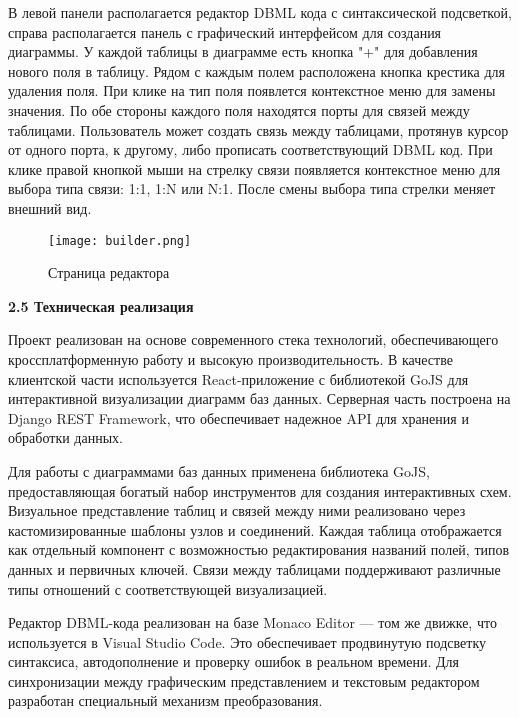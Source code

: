В левой панели располагается редактор DBML кода с синтаксической подсветкой, справа располагается панель с графический интерфейсом для создания диаграммы. У каждой таблицы в диаграмме есть кнопка "+" для добавления нового поля в таблицу. Рядом с каждым полем расположена кнопка крестика для удаления поля. При клике на тип поля появлется контекстное меню для замены значения. По обе стороны каждого поля находятся порты для связей между таблицами. Пользователь может создать связь между таблицами, протянув курсор от одного порта, к другому, либо прописать соответствующий DBML код. При клике правой кнопкой мыши на стрелку связи появляется контекстное меню для выбора типа связи: 1:1, 1:N или N:1. После смены выбора типа стрелки меняет внешний вид.
    
\renewcommand{\figurename}{Рисунок}
\begin{figure}[htbp]
    \centering %
    \texttt{[image: builder.png]}
    \caption{Страница редактора}
    \label{fig:analyze} %
\end{figure}

\textbf{2.5 Техническая реализация}

Проект реализован на основе современного стека технологий, обеспечивающего кроссплатформенную работу и высокую производительность. В качестве клиентской части используется React-приложение с библиотекой GoJS для интерактивной визуализации диаграмм баз данных. Серверная часть построена на Django REST Framework, что обеспечивает надежное API для хранения и обработки данных.

Для работы с диаграммами баз данных применена библиотека GoJS, предоставляющая богатый набор инструментов для создания интерактивных схем. Визуальное представление таблиц и связей между ними реализовано через кастомизированные шаблоны узлов и соединений. Каждая таблица отображается как отдельный компонент с возможностью редактирования названий полей, типов данных и первичных ключей. Связи между таблицами поддерживают различные типы отношений с соответствующей визуализацией.

Редактор DBML-кода реализован на базе Monaco Editor — том же движке, что используется в Visual Studio Code. Это обеспечивает продвинутую подсветку синтаксиса, автодополнение и проверку ошибок в реальном времени. Для синхронизации между графическим представлением и текстовым редактором разработан специальный механизм преобразования.

